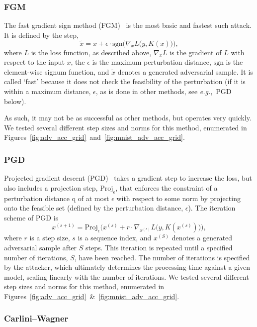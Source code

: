 \documentclass[journal]{IEEEtran}
\begin{document}
\subsubsection{FGM}

The fast gradient sign method (FGM)~\cite{fgm} is the most basic and fastest such attack.
It is defined by the step,
$$
   \widetilde{x} = x + \epsilon \cdot \textrm{sgn}\Big(\nabla_{x} L\big(y, K(x)\big)\Big),
$$
where $L$ is the loss function, as described above, $\nabla_{x} L$ is the gradient of $L$ with respect to the input $x$, the $\epsilon$ is the maximum perturbation distance, $\textrm{sgn}$ is the element-wise signum function, and $\widetilde{x}$ denotes a generated adversarial sample.
It is called `fast' because it does not check the feasibility of the perturbation (if it is within a maximum distance, $\epsilon$, as is done in other methods, see \textit{e.g.},~PGD below).

As such, it may not be as successful as other methods, but operates very quickly.
We tested several different step sizes and norms for this method, enumerated in Figures~\ref{fig:adv_acc_grid}~and~\ref{fig:mnist_adv_acc_grid}.

\subsubsection{PGD}

Projected gradient descent (PGD)~\cite{carlini_towards_2017} takes a gradient step to increase the loss, but also includes a projection step, $\mathrm{Proj}_\epsilon$, that enforces the constraint of a perturbation distance q of at most $\epsilon$ with respect to some norm by projecting onto the feasible set (defined by the perturbation distance, $\epsilon$).
The iteration scheme of PGD is
$$
    x^{(s+1)} = \mathrm{Proj}_\epsilon \Big( x^{(s)} + r \cdot \nabla_{x^{(s)}} L\big(y, K(x^{(s)})\big) \Big),
$$
where $r$ is a step size, $s$ is a sequence index, and $x^{(S)}$ denotes a generated adversarial sample after $S$ steps.
This iteration is repeated until a specified number of iterations, $S$, have been reached.
The number of iterations is specified by the attacker, which ultimately determines the processing-time against a given model, scaling linearly with the number of iterations.
We tested several different step sizes and norms for this method, enumerated in Figures~\ref{fig:adv_acc_grid}~\&~\ref{fig:mnist_adv_acc_grid}.

\subsubsection{Carlini--Wagner}
\end{document}
